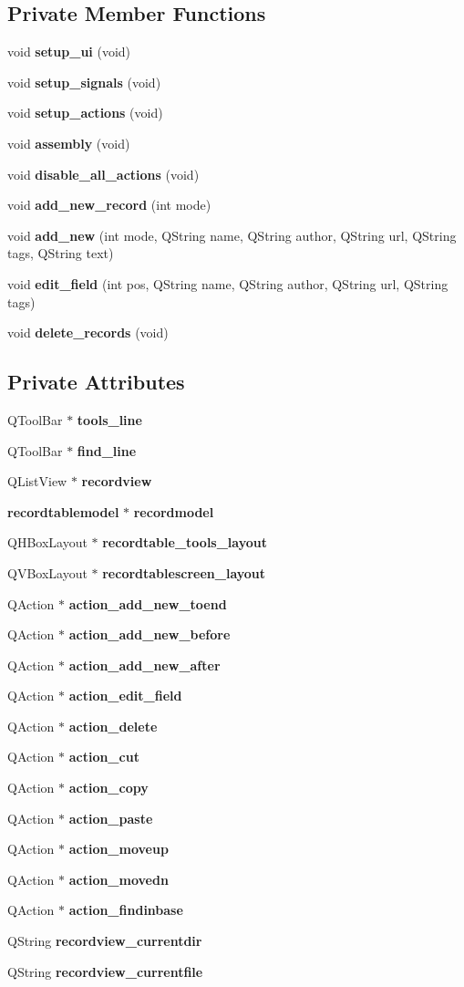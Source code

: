 \subsection*{Private Member Functions}
\begin{CompactItemize}
\item 
void {\bf setup\_\-ui} (void)
\item 
void {\bf setup\_\-signals} (void)
\item 
void {\bf setup\_\-actions} (void)
\item 
void {\bf assembly} (void)
\item 
void {\bf disable\_\-all\_\-actions} (void)
\item 
void {\bf add\_\-new\_\-record} (int mode)
\item 
void {\bf add\_\-new} (int mode, QString name, QString author, QString url, QString tags, QString text)
\item 
void {\bf edit\_\-field} (int pos, QString name, QString author, QString url, QString tags)
\item 
void {\bf delete\_\-records} (void)
\end{CompactItemize}
\subsection*{Private Attributes}
\begin{CompactItemize}
\item 
QTool\-Bar $\ast$ {\bf tools\_\-line}
\item 
QTool\-Bar $\ast$ {\bf find\_\-line}
\item 
QList\-View $\ast$ {\bf recordview}
\item 
{\bf recordtablemodel} $\ast$ {\bf recordmodel}
\item 
QHBox\-Layout $\ast$ {\bf recordtable\_\-tools\_\-layout}
\item 
QVBox\-Layout $\ast$ {\bf recordtablescreen\_\-layout}
\item 
QAction $\ast$ {\bf action\_\-add\_\-new\_\-toend}
\item 
QAction $\ast$ {\bf action\_\-add\_\-new\_\-before}
\item 
QAction $\ast$ {\bf action\_\-add\_\-new\_\-after}
\item 
QAction $\ast$ {\bf action\_\-edit\_\-field}
\item 
QAction $\ast$ {\bf action\_\-delete}
\item 
QAction $\ast$ {\bf action\_\-cut}
\item 
QAction $\ast$ {\bf action\_\-copy}
\item 
QAction $\ast$ {\bf action\_\-paste}
\item 
QAction $\ast$ {\bf action\_\-moveup}
\item 
QAction $\ast$ {\bf action\_\-movedn}
\item 
QAction $\ast$ {\bf action\_\-findinbase}
\item 
QString {\bf recordview\_\-currentdir}
\item 
QString {\bf recordview\_\-currentfile}
\end{CompactItemize}


